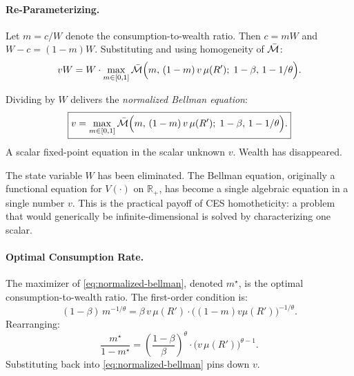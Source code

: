 \paragraph{Re-Parameterizing.}
Let $m = c/W$ denote the consumption-to-wealth ratio. Then $c = mW$ and $W - c = (1-m)W$. Substituting and using homogeneity of $\bar{\mathcal{M}}$:
\begin{equation}
v W = W \cdot \max_{m \in [0, 1]} \bar{\mathcal{M}}\Big( m, \, (1-m) \, v \, \mu(R'); \; 1-\beta, \, 1-1/\theta \Big).
\label{eq:bellman-m}
\end{equation}

Dividing by $W$ delivers the \emph{normalized Bellman equation}:
\begin{equation}
\boxed{v = \max_{m \in [0, 1]} \bar{\mathcal{M}}\Big( m, \, (1-m) \, v \, \mu(R'); \; 1-\beta, \, 1-1/\theta \Big).}
\label{eq:normalized-bellman}
\end{equation}
A scalar fixed-point equation in the scalar unknown $v$. Wealth has disappeared.

\begin{calloutimportant}
The state variable $W$ has been eliminated. The Bellman equation, originally a functional equation for $V(\cdot)$ on $\mathbb{R}_+$, has become a single algebraic equation in a single number $v$. This is the practical payoff of CES homotheticity: a problem that would generically be infinite-dimensional is solved by characterizing one scalar.
\end{calloutimportant}

\paragraph{Optimal Consumption Rate.}
The maximizer of \cref{eq:normalized-bellman}, denoted $m^\star$, is the optimal consumption-to-wealth ratio. The first-order condition is:
\begin{equation}
(1-\beta) \, m^{-1/\theta} = \beta \, v \, \mu(R') \cdot \big( (1-m) v \mu(R') \big)^{-1/\theta}.
\label{eq:m-foc}
\end{equation}
Rearranging:
\begin{equation}
\frac{m^\star}{1 - m^\star} = \left( \frac{1-\beta}{\beta} \right)^\theta \cdot \big( v \, \mu(R') \big)^{\theta - 1}.
\label{eq:m-formula}
\end{equation}
Substituting back into \cref{eq:normalized-bellman} pins down $v$.

